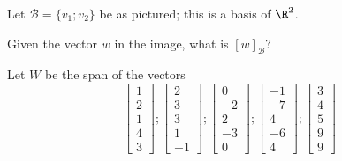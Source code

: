 
\edXsolution{ 

}

\endedxproblem




\begin{center}

\end{center}

Let $\mathcal{B} = \{v_1; v_2\}$ be as pictured; this is a basis of $\R^2$.  

Given the vector $w$ in the image, what is $[w]_{\mathcal{B}}$?  







\endedxproblem



Let $W$ be the span of the vectors 
\[
\left[ \begin{array}{c} 1 \\ 2 \\ 1 \\ 4 \\ 3\end{array} \right] ; 
\left[ \begin{array}{c} 2 \\ 3 \\ 3 \\ 1 \\ -1\end{array} \right] ; 
\left[ \begin{array}{c} 0 \\ -2 \\ 2 \\ -3 \\ 0 \end{array} \right] ;
\left[ \begin{array}{c} -1 \\ -7 \\ 4 \\ -6 \\ 4\end{array} \right] ;
\left[ \begin{array}{c} 3 \\ 4 \\ 5 \\ 9 \\ 9\end{array} \right]
 \]

